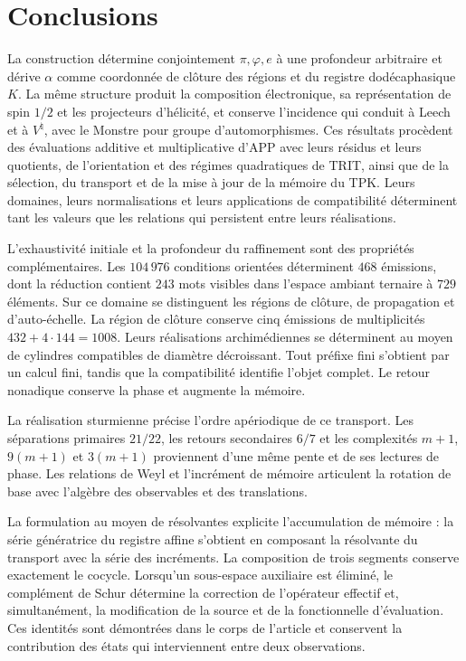 \section{Conclusions}
\label{sec:conclusiones}
\begingroup
\fontsize{10.5}{13}\selectfont
\setlength{\parskip}{2pt plus 1pt minus .5pt}

La construction détermine conjointement \(\pi,\varphi,e\) à une profondeur
arbitraire et dérive \(\alpha\) comme coordonnée de clôture des régions
et du registre dodécaphasique \(K\). La même structure produit la
composition électronique, sa représentation de spin \(1/2\) et les
projecteurs d'hélicité, et conserve l'incidence qui conduit à Leech
et à \(V^\natural\), avec le Monstre pour groupe d'automorphismes.
Ces résultats procèdent des évaluations additive et multiplicative
d'APP avec leurs résidus et leurs quotients, de l'orientation et des régimes
quadratiques de TRIT, ainsi que de la sélection, du transport et de la mise à jour
de la mémoire du TPK. Leurs domaines, leurs normalisations et leurs applications de
compatibilité déterminent tant les valeurs que les relations qui
persistent entre leurs réalisations.

L'exhaustivité initiale et la profondeur du raffinement sont des propriétés complémentaires. Les \(104\,976\) conditions orientées déterminent \(468\) émissions, dont la réduction contient \(243\) mots visibles dans l'espace ambiant ternaire à \(729\) éléments. Sur ce domaine se distinguent les régions de clôture, de propagation et d'auto-échelle. La région de clôture conserve cinq émissions de multiplicités \(432+4\cdot144=1008\). Leurs réalisations archimédiennes se déterminent au moyen de cylindres compatibles de diamètre décroissant. Tout préfixe fini s'obtient par un calcul fini, tandis que la compatibilité identifie l'objet complet. Le retour nonadique conserve la phase et augmente la mémoire.

La réalisation sturmienne précise l'ordre apériodique de ce transport. Les séparations primaires \(21/22\), les retours secondaires \(6/7\) et les complexités \(m+1\), \(9(m+1)\) et \(3(m+1)\) proviennent d'une même pente et de ses lectures de phase. Les relations de Weyl et l'incrément de mémoire articulent la rotation de base avec l'algèbre des observables et des translations.

La formulation au moyen de résolvantes explicite l'accumulation de mémoire : la série génératrice du registre affine s'obtient en composant la résolvante du transport avec la série des incréments. La composition de trois segments conserve exactement le cocycle. Lorsqu'un sous-espace auxiliaire est éliminé, le complément de Schur détermine la correction de l'opérateur effectif et, simultanément, la modification de la source et de la fonctionnelle d'évaluation. Ces identités sont démontrées dans le corps de l'article et conservent la contribution des états qui interviennent entre deux observations.

